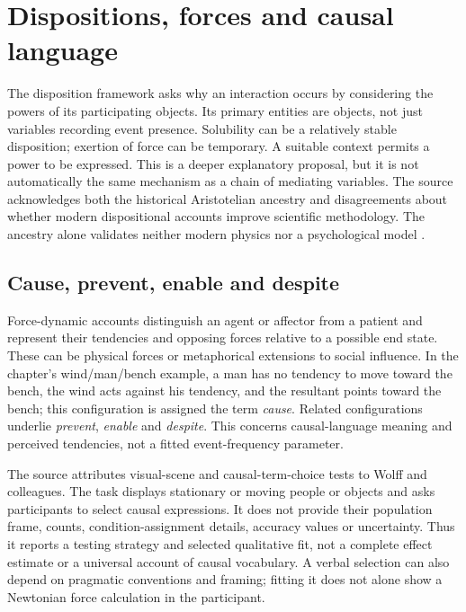 \section{Dispositions, forces and causal language}
\label{sec:p19-rat72-disposition}

The disposition framework asks why an interaction occurs by considering
the powers of its participating objects. Its primary entities are
objects, not just variables recording event presence. Solubility can
be a relatively stable disposition; exertion of force can be temporary.
A suitable context permits a power to be expressed. This is a deeper
explanatory proposal, but it is not automatically the same mechanism
as a chain of mediating variables. The source acknowledges both the
historical Aristotelian ancestry and disagreements about whether
modern dispositional accounts improve scientific methodology. The
ancestry alone validates neither modern physics nor a psychological
model
\cite[Sec.~3.2, p.~444]{Waldmann2021EverydayCausal}.

\subsection{Cause, prevent, enable and despite}

Force-dynamic accounts distinguish an agent or affector from a patient
and represent their tendencies and opposing forces relative to a
possible end state. These can be physical forces or metaphorical
extensions to social influence. In the chapter's wind/man/bench
example, a man has no tendency to move toward the bench, the wind
acts against his tendency, and the resultant points toward the bench;
this configuration is assigned the term \emph{cause}. Related
configurations underlie \emph{prevent}, \emph{enable} and
\emph{despite}. This concerns causal-language meaning and perceived
tendencies, not a fitted event-frequency parameter.

The source attributes visual-scene and causal-term-choice tests to
Wolff and colleagues. The task displays stationary or moving people
or objects and asks participants to select causal expressions. It does
not provide their population frame, counts, condition-assignment details,
accuracy values or uncertainty. Thus it reports a testing strategy
and selected qualitative fit, not a complete effect estimate or a
universal account of causal vocabulary. A verbal selection can also
depend on pragmatic conventions and framing; fitting it does not
alone show a Newtonian force calculation in the participant.

